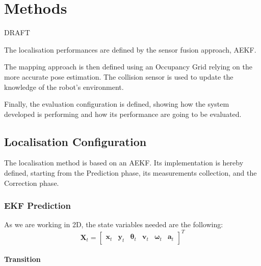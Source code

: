 \chapter{Methods}
\label{ch:methods}

DRAFT

\noindent
The localisation performances are defined by the sensor fusion approach, \gls{AEKF}.%

The mapping approach is then defined using an Occupancy Grid relying on the more accurate pose estimation.
The collision sensor is used to update the knowledge of the robot's environment.

Finally, the evaluation configuration is defined, showing how the system developed is performing and how its performance are going to be evaluated.



\section{Localisation Configuration}
\label{sec:locConf}
\noindent
The localisation method is based on an \gls{AEKF}.
Its implementation is hereby defined, starting from the Prediction phase, its measurements collection, and the Correction phase.


\subsection{ \gls{EKF} Prediction}

\noindent
As we are working in 2D, the state variables needed are the following:
$$
  \label{eq:state-transf}
\mathbf{X}_t=
\begin{bmatrix}
\mathbf{x}_t & \mathbf{y}_t & \boldsymbol \theta_t & \mathbf{v}_t & \boldsymbol \omega_t & \mathbf{a}_t
\end{bmatrix} ^T
$$

\subsubsection{Transition}

